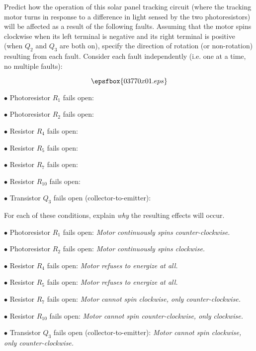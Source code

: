 

Predict how the operation of this solar panel tracking circuit (where the tracking motor turns in response to a difference in light sensed by the two photoresistors) will be affected as a result of the following faults.  Assuming that the motor spins clockwise when its left terminal is negative and its right terminal is positive (when $Q_2$ and $Q_3$ are both on), specify the direction of rotation (or non-rotation) resulting from each fault.  Consider each fault independently (i.e. one at a time, no multiple faults):

$$\epsfbox{03770x01.eps}$$

\medskip
\item{$\bullet$} Photoresistor $R_1$ fails open:
\vskip 5pt
\item{$\bullet$} Photoresistor $R_2$ fails open:
\vskip 5pt
\item{$\bullet$} Resistor $R_4$ fails open:
\vskip 5pt
\item{$\bullet$} Resistor $R_5$ fails open:
\vskip 5pt
\item{$\bullet$} Resistor $R_7$ fails open:
\vskip 5pt
\item{$\bullet$} Resistor $R_{10}$ fails open:
\vskip 5pt
\item{$\bullet$} Transistor $Q_3$ fails open (collector-to-emitter):
\medskip

For each of these conditions, explain {\it why} the resulting effects will occur.







\medskip
\item{$\bullet$} Photoresistor $R_1$ fails open: {\it Motor continuously spins counter-clockwise.}
\vskip 5pt
\item{$\bullet$} Photoresistor $R_2$ fails open: {\it Motor continuously spins clockwise.}
\vskip 5pt
\item{$\bullet$} Resistor $R_4$ fails open: {\it Motor refuses to energize at all.}
\vskip 5pt
\item{$\bullet$} Resistor $R_5$ fails open: {\it Motor refuses to energize at all.}
\vskip 5pt
\item{$\bullet$} Resistor $R_7$ fails open: {\it Motor cannot spin clockwise, only counter-clockwise.}
\vskip 5pt
\item{$\bullet$} Resistor $R_{10}$ fails open: {\it Motor cannot spin counter-clockwise, only clockwise.}
\vskip 5pt
\item{$\bullet$} Transistor $Q_3$ fails open (collector-to-emitter): {\it Motor cannot spin clockwise, only counter-clockwise.}
\medskip

